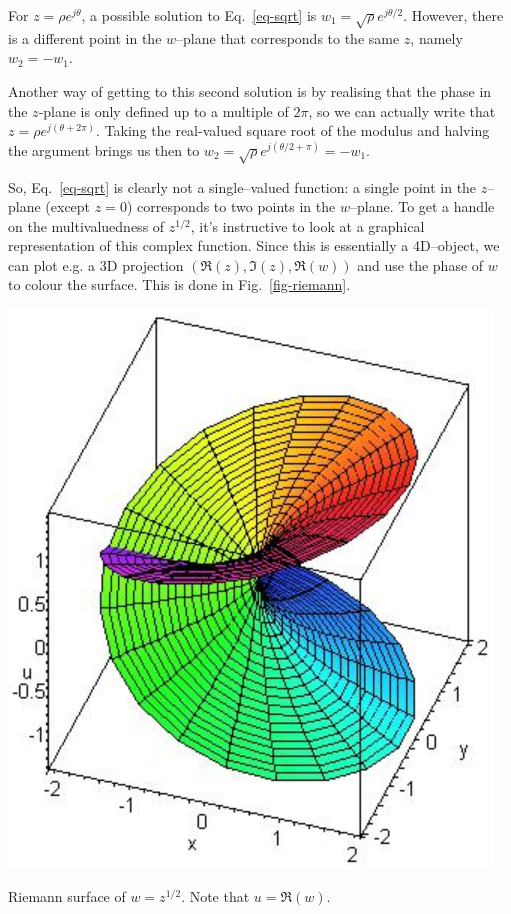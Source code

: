 For $z=\rho e^{j\theta}$, a possible solution to Eq.~\ref{eq-sqrt} is $w_1 = \sqrt{\rho} e^{j\theta/2}$. However, there is a different point in the $w$--plane that corresponds to the same $z$, namely  $w_2=-w_1$. 

Another way of getting to this second solution is by realising that the phase in the $z$-plane is only defined up to a multiple of $2\pi$, so we can actually write that  $z=\rho e^{j(\theta +2\pi)}$. Taking the real-valued square root of the modulus and halving the argument brings us then to $w_2 = \sqrt{\rho} e^{j(\theta/2+\pi)} = -w_1$.

So, Eq.~\ref{eq-sqrt} is clearly not a single--valued function: a single point in the $z$--plane (except $z=0$) corresponds to two points in the $w$--plane. To get a handle on the multivaluedness of $z^{1/2}$, it's instructive to look at a graphical representation of this complex function. Since this is essentially a 4D--object, we can plot e.g. a 3D projection $(\Re(z),\Im(z),\Re(w))$ and use the phase of $w$ to colour the surface. This is done in Fig.~\ref{fig-riemann}.

\begin{marginfigure}[-3cm]
\centering
\includegraphics{complex/figures/riemann}
\caption{Riemann surface of $w=z^{1/2}$. Note that $u=\Re(w)$. }
\label{fig-riemann}
\end{marginfigure}

